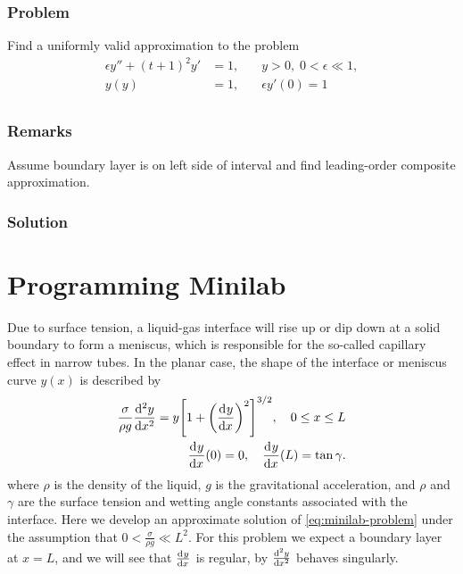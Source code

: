 \documentclass[12pt,twoside]{article}
\begin{document}
\subsubsection*{Problem}
Find a uniformly valid approximation to the problem
\begin{equation}
  \label{eq:3.4.3-problem}
  \begin{aligned}
    \epsilon y''+{(t+1)}^2y'&=1, &\quad y>0,\;0<\epsilon\ll1,\\
    y(y)&=1, &\quad \epsilon y'(0)=1 \\
  \end{aligned}
\end{equation}
\subsubsection*{Remarks}
Assume boundary layer is on left side of interval and find leading-order
composite approximation.
\subsubsection*{Solution}
\todo{}

\section{Programming Minilab}
Due to surface tension, a liquid-gas interface will rise up or dip down at a
solid boundary to form a meniscus, which is responsible for the so-called
capillary effect in narrow tubes. In the planar case, the shape of the interface
or meniscus curve $y(x)$ is described by
\begin{equation}
  \label{eq:minilab-problem}
  \begin{aligned}
    \frac{\sigma}{\rho g}\od[2]{y}{x} = y {\left[ 1 + {\left( \od{y}{x}
          \right)}^2 \right]}^{3/2},\quad 0\le x\le L \\
    \od{y}{x}(0) = 0,\quad \od{y}{x}(L) = \tan\gamma.
  \end{aligned}
\end{equation}
where $\rho$ is the density of the liquid, $g$ is the gravitational
acceleration, and $\rho$ and $\gamma$ are the surface tension and wetting angle
constants associated with the interface. Here we develop an approximate solution
of \cref{eq:minilab-problem} under the assumption that $0<\frac{\sigma}{\rho
  g}\ll L^2$. For this problem we expect a boundary layer at $x=L$, and we will
see that $\od{y}{x}$ is regular, by $\od[2]{y}{x}$ behaves singularly.
\end{document}
